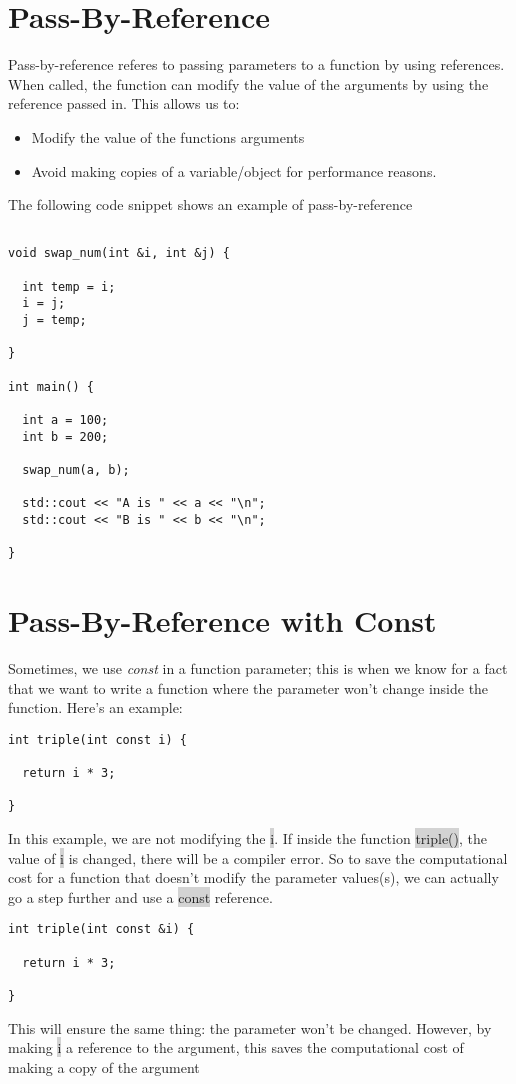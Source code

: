 \documentclass{report}
\begin{document}
\section{Pass-By-Reference}
Pass-by-reference referes to passing parameters to a function by using references. When called, the function can modify the value of the arguments by using the reference passed in.
\bigbreak \noindent
This allows us to:
\begin{itemize}
\item Modify the value of the functions arguments
\item Avoid making copies of a variable/object for performance reasons.
\end{itemize}
\bigbreak \noindent
The following code snippet shows an example of pass-by-reference
\bigbreak \noindent
\begin{verbatim}

void swap_num(int &i, int &j) {

  int temp = i;
  i = j;
  j = temp;

}

int main() {

  int a = 100;
  int b = 200;

  swap_num(a, b);

  std::cout << "A is " << a << "\n";
  std::cout << "B is " << b << "\n";

}
\end{verbatim}
\section{Pass-By-Reference with Const}
Sometimes, we use \textit{const} in a function parameter; this is when we know for a fact that we want to write a function where the parameter won't change inside the function. Here's an example:
\bigbreak \noindent
\begin{verbatim}
int triple(int const i) {

  return i * 3;

}
\end{verbatim}
In this example, we are not modifying the \colorbox{lightgray}{i}. If inside the function \colorbox{lightgray}{triple()}, the value of \colorbox{lightgray}{i} is changed, there will be a compiler error.
\bigbreak \noindent
So to save the computational cost for a function that doesn't modify the parameter values(s), we can actually go a step further and use a \colorbox{lightgray}{const} reference.
\bigbreak \noindent
\begin{verbatim}
int triple(int const &i) {

  return i * 3;

}
\end{verbatim}
This will ensure the same thing: the parameter won't be changed.
However, by making \colorbox{lightgray}{i} a reference to the argument, this saves the computational cost of making a copy of the argument
\end{document}
